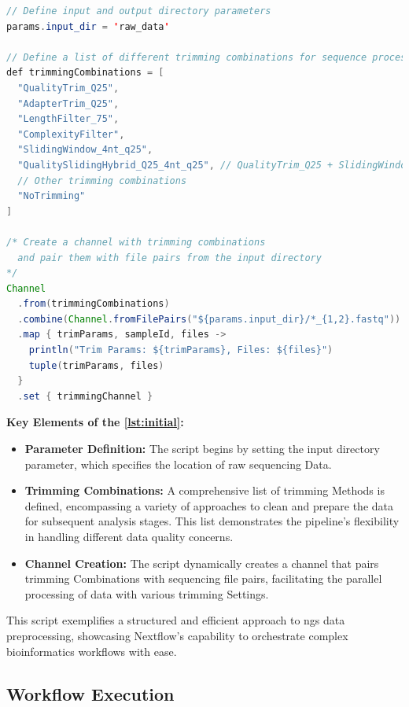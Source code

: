 \begin{lstlisting}[language=Java, label={lst:initial}, caption={Initial setup and trimming strategy definition in Nextflow.}]
// Define input and output directory parameters
params.input_dir = 'raw_data'

// Define a list of different trimming combinations for sequence processing
def trimmingCombinations = [
  "QualityTrim_Q25",
  "AdapterTrim_Q25",
  "LengthFilter_75",
  "ComplexityFilter",
  "SlidingWindow_4nt_q25",
  "QualitySlidingHybrid_Q25_4nt_q25", // QualityTrim_Q25 + SlidingWindow_4nt_q25
  // Other trimming combinations
  "NoTrimming"
]

/* Create a channel with trimming combinations 
  and pair them with file pairs from the input directory
*/
Channel
  .from(trimmingCombinations)
  .combine(Channel.fromFilePairs("${params.input_dir}/*_{1,2}.fastq"))
  .map { trimParams, sampleId, files -> 
    println("Trim Params: ${trimParams}, Files: ${files}") 
    tuple(trimParams, files) 
  }
  .set { trimmingChannel }

\end{lstlisting}

\textbf{Key Elements of the \autoref{lst:initial}:}

\begin{itemize}
    \item \textbf{Parameter Definition:} The script begins by setting the input directory parameter, which specifies the location of raw \gls{sequencing} Data.
    \item \textbf{Trimming Combinations:} A comprehensive list of \gls{trimming} Methods is defined, encompassing a variety of approaches to clean and prepare the data for subsequent analysis stages. This list demonstrates the pipeline's flexibility in handling different data quality concerns.
    \item \textbf{Channel Creation:} The script dynamically creates a channel that pairs \gls{trimming} Combinations with \gls{sequencing} file pairs, facilitating the parallel processing of data with various \gls{trimming} Settings.
\end{itemize}

This script exemplifies a structured and efficient approach to \gls{ngs} data preprocessing, showcasing Nextflow's capability to orchestrate complex bioinformatics workflows with ease.


\subsection{Workflow Execution}

